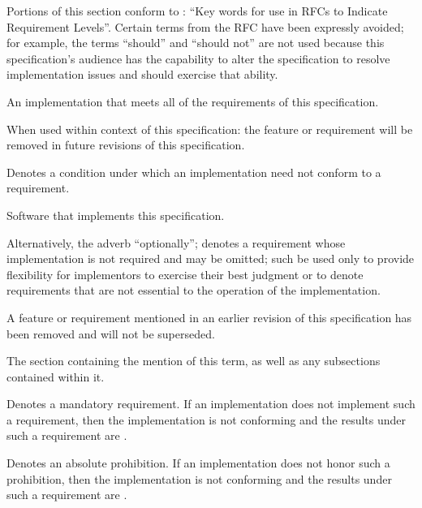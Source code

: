 %

\label{s:specdfn}

Portions of this section conform to : ``Key words for use in RFCs to
Indicate Requirement Levels''. Certain terms from the RFC have been expressly
avoided; for example, the terms ``should'' and ``should not'' are not used
because this specification's audience has the capability to alter the
specification to resolve implementation issues and should exercise that ability.

\begin{description}
  An implementation that meets all of the requirements of this specification.

  When used within context of this specification: the feature or requirement
  will be removed in future revisions of this specification.

  Denotes a condition under which an implementation need not conform to a
  requirement.

  Software that implements this specification.

  Alternatively, the adverb ``optionally''; denotes a requirement whose
  implementation is not required and may be omitted; such \shall be used only to
  provide flexibility for implementors to exercise their best judgment or to
  denote requirements that are not essential to the operation of the
  implementation.

  A feature or requirement mentioned in an earlier revision of this
  specification has been removed and will not be superseded.

  The section containing the mention of this term, as well as any subsections
  contained within it.

  Denotes a mandatory requirement. If an implementation does not implement such
  a requirement, then the implementation is not conforming and the results under
  such a requirement are \undefined.

  Denotes an absolute prohibition. If an implementation does not honor such a
  prohibition, then the implementation is not conforming and the results under
  such a requirement are \undefined.


\end{description}
